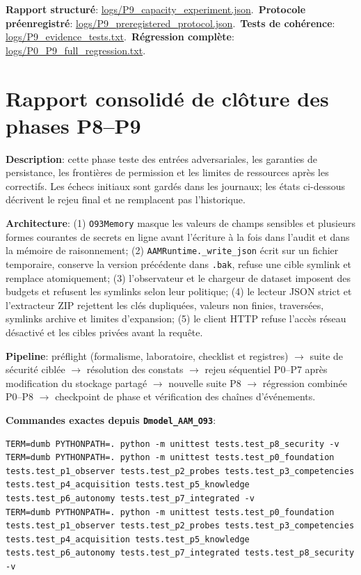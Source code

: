 \documentclass[11pt,a4paper,oneside]{report}
\begin{document}
\textbf{Rapport structuré}: \url{logs/P9_capacity_experiment.json}.\
\textbf{Protocole préenregistré}: \url{logs/P9_preregistered_protocol.json}.\
\textbf{Tests de cohérence}: \url{logs/P9_evidence_tests.txt}.\
\textbf{Régression complète}: \url{logs/P0_P9_full_regression.txt}.

\chapter{Rapport consolidé de clôture des phases P8--P9}
\textbf{Description}: cette phase teste des entrées adversariales, les garanties de persistance, les frontières de permission et les limites de ressources après les correctifs. Les échecs initiaux sont gardés dans les journaux; les états ci-dessous décrivent le rejeu final et ne remplacent pas l'historique.

\textbf{Architecture}: (1) \texttt{O93Memory} masque les valeurs de champs sensibles et plusieurs formes courantes de secrets en ligne avant l’écriture à la fois dans l’audit et dans la mémoire de raisonnement; (2) \texttt{AAMRuntime.\_write\_json} écrit sur un fichier temporaire, conserve la version précédente dans \texttt{.bak}, refuse une cible symlink et remplace atomiquement; (3) l’observateur et le chargeur de dataset imposent des budgets et refusent les symlinks selon leur politique; (4) le lecteur JSON strict et l’extracteur ZIP rejettent les clés dupliquées, valeurs non finies, traversées, symlinks archive et limites d’expansion; (5) le client HTTP refuse l’accès réseau désactivé et les cibles privées avant la requête.

\textbf{Pipeline}: préflight (formalisme, laboratoire, checklist et registres) $\rightarrow$ suite de sécurité ciblée $\rightarrow$ résolution des constats $\rightarrow$ rejeu séquentiel P0--P7 après modification du stockage partagé $\rightarrow$ nouvelle suite P8 $\rightarrow$ régression combinée P0--P8 $\rightarrow$ checkpoint de phase et vérification des chaînes d’événements.

\textbf{Commandes exactes depuis \texttt{Dmodel\_AAM\_O93}}:
\begin{lstlisting}[basicstyle=\ttfamily\small,breaklines=true]
TERM=dumb PYTHONPATH=. python -m unittest tests.test_p8_security -v
TERM=dumb PYTHONPATH=. python -m unittest tests.test_p0_foundation tests.test_p1_observer tests.test_p2_probes tests.test_p3_competencies tests.test_p4_acquisition tests.test_p5_knowledge tests.test_p6_autonomy tests.test_p7_integrated -v
TERM=dumb PYTHONPATH=. python -m unittest tests.test_p0_foundation tests.test_p1_observer tests.test_p2_probes tests.test_p3_competencies tests.test_p4_acquisition tests.test_p5_knowledge tests.test_p6_autonomy tests.test_p7_integrated tests.test_p8_security -v
\end{lstlisting}
\end{document}
